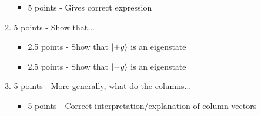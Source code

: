\documentclass[12pt]{article}
\begin{document}
\begin{enumerate}[font=\bfseries]
\begin{enumerate}
\begin{itemize}
                    \item 5 points - Gives correct expression
                \end{itemize}
            \item 5 points - Show that...
                \begin{itemize}
                    \item 2.5 points - Show that $\ket{+y}$ is an eigenstate
                    \item 2.5 points - Show that $\ket{-y}$ is an eigenstate
                \end{itemize}
            \item 5 points - More generally, what do the columns...
                \begin{itemize}
                    \item 5 points - Correct interpretation/explanation of column vectors
                \end{itemize}
        \end{enumerate}
\end{enumerate}
\end{document}
